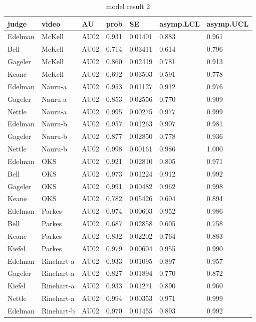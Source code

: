 \documentclass{monashthesis}
\begin{document}
\begin{center}
\begin{longtable}{lllllll}
\caption{\label{tab:result_2} model result 2}\\
\toprule
judge & video & AU & prob & SE & asymp.LCL & asymp.UCL \\
\midrule
\endhead
\bottomrule
\endfoot
Edelman & McKell & AU02 & 0.931 & 0.01401 & 0.883 & 0.961 \\
Bell & McKell & AU02 & 0.714 & 0.03411 & 0.614 & 0.796 \\
Gageler & McKell & AU02 & 0.860 & 0.02419 & 0.781 & 0.913 \\
Keane & McKell & AU02 & 0.692 & 0.03503 & 0.591 & 0.778 \\
Edelman & Nauru-a & AU02 & 0.953 & 0.01127 & 0.912 & 0.976 \\
Gageler & Nauru-a & AU02 & 0.853 & 0.02556 & 0.770 & 0.909 \\
Nettle & Nauru-a & AU02 & 0.995 & 0.00275 & 0.977 & 0.999 \\
Edelman & Nauru-b & AU02 & 0.957 & 0.01263 & 0.907 & 0.981 \\
Gageler & Nauru-b & AU02 & 0.877 & 0.02850 & 0.778 & 0.936 \\
Nettle & Nauru-b & AU02 & 0.998 & 0.00161 & 0.986 & 1.000 \\
Edelman & OKS & AU02 & 0.921 & 0.02810 & 0.805 & 0.971 \\
Bell & OKS & AU02 & 0.973 & 0.01224 & 0.912 & 0.992 \\
Gageler & OKS & AU02 & 0.991 & 0.00482 & 0.962 & 0.998 \\
Keane & OKS & AU02 & 0.782 & 0.05426 & 0.604 & 0.894 \\
Edelman & Parkes & AU02 & 0.974 & 0.00603 & 0.952 & 0.986 \\
Bell & Parkes & AU02 & 0.687 & 0.02858 & 0.605 & 0.758 \\
Keane & Parkes & AU02 & 0.832 & 0.02202 & 0.764 & 0.883 \\
Kiefel & Parkes & AU02 & 0.979 & 0.00604 & 0.955 & 0.990 \\
Edelman & Rinehart-a & AU02 & 0.933 & 0.01095 & 0.897 & 0.957 \\
Gageler & Rinehart-a & AU02 & 0.827 & 0.01894 & 0.770 & 0.872 \\
Kiefel & Rinehart-a & AU02 & 0.933 & 0.01271 & 0.890 & 0.960 \\
Nettle & Rinehart-a & AU02 & 0.994 & 0.00353 & 0.971 & 0.999 \\
Edelman & Rinehart-b & AU02 & 0.970 & 0.01455 & 0.893 & 0.992 \\

\end{longtable}
\end{center}
\end{document}
